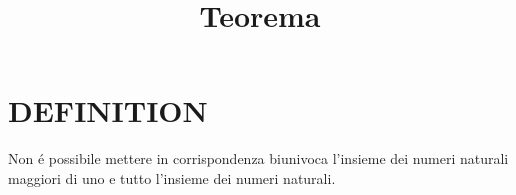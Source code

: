\documentclass[]{article}
\title{Teorema}
\begin{document}
\maketitle

\section{DEFINITION}
Non \'{e} possibile mettere in corrispondenza biunivoca l'insieme dei numeri naturali maggiori di uno e tutto l'insieme dei numeri naturali.
\end{document}
